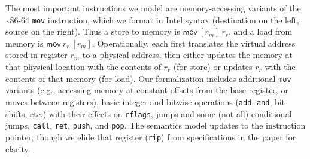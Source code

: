 The most important instructions we model are memory-accessing variants of the x86-64 \lstinline|mov| instruction, which we format in Intel syntax
(destination on the left, source on the right).
Thus a store to memory is $\textsf{mov}~[r_m]~r_r$, and a load from memory is $\textsf{mov}~r_r~[r_m]$.
Operationally, each first translates the virtual address stored in register $r_m$ to a physical address,
then either updates the memory at that physical location with the contents of $r_r$ (for store)
or updates $r_r$ with the contents of that memory (for load).
Our formalization includes
additional \lstinline|mov| variants (e.g., accessing memory at constant offsets from the base register, or moves between registers),
basic integer and bitwise operations (\lstinline|add|,
\lstinline|and|, bit shifts, etc.) with their effects on \lstinline|rflags|, jumps and some (not all) conditional jumps, \lstinline|call|, \lstinline|ret|, \lstinline|push|,
and \lstinline|pop|.
The semantics model updates to the instruction pointer, though we elide that register (\lstinline|rip|)
from specifications in the paper for clarity.
